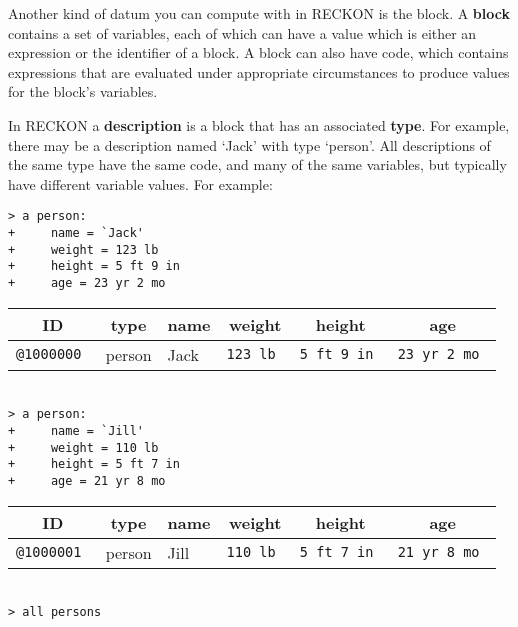 \documentclass[12pt]{article}
\newcommand{\key}[1]{{\rm \bfseries #1}}
\newenvironment{indpar}[1][0.3in]%
	{\begin{list}{}%
		     {\setlength{\itemsep}{0in}%
		      \setlength{\topsep}{0in}%
		      \setlength{\parsep}{1ex}%
		      \setlength{\labelwidth}{#1}%
		      \setlength{\leftmargin}{#1}%
		      \addtolength{\leftmargin}{\labelsep}}%
	 \item}%
	{\end{list}}
\begin{document}
Another kind of datum you can compute with in RECKON is
the block.  A \key{block} contains a set of variables, each of which
can have a value which is either an expression or the identifier of a
block.  A block can also
have code, which contains expressions that are evaluated under appropriate
circumstances to produce values for the block's variables.

In RECKON a \key{description}
is a block that has an associated \key{type}.  For
example, there may be a description named `Jack' with type `person'.
All descriptions
of the same type have the same code, and many of the same variables,
but typically have different variable values.  For example:

\begin{indpar}
\verb|> a person:| \\
\verb|+     name = `Jack'| \\
\verb|+     weight = 123 lb| \\
\verb|+     height = 5 ft 9 in| \\
\verb|+     age = 23 yr 2 mo| \\
\begin{tabular}{|r|l|l|r|r|r|}
\hline
\multicolumn{1}{|c}{\bf ID} &
\multicolumn{1}{|c}{\bf type} &
\multicolumn{1}{|c}{\bf name} &
\multicolumn{1}{|c}{\bf weight} &
\multicolumn{1}{|c}{\bf height} &
\multicolumn{1}{|c|}{\bf age} \\
\hline
\tt @1000000 & person & Jack & \tt 123 lb & \tt 5 ft 9 in & \tt 23 yr 2 mo \\
\hline
\end{tabular} \\[0.5ex]
\verb|> a person:| \\
\verb|+     name = `Jill'| \\
\verb|+     weight = 110 lb| \\
\verb|+     height = 5 ft 7 in| \\
\verb|+     age = 21 yr 8 mo| \\
\begin{tabular}{|r|l|l|r|r|r|}
\hline
\multicolumn{1}{|c}{\bf ID} &
\multicolumn{1}{|c}{\bf type} &
\multicolumn{1}{|c}{\bf name} &
\multicolumn{1}{|c}{\bf weight} &
\multicolumn{1}{|c}{\bf height} &
\multicolumn{1}{|c|}{\bf age} \\
\hline
\tt @1000001 & person & Jill & \tt 110 lb & \tt 5 ft 7 in & \tt 21 yr 8 mo \\
\hline
\end{tabular} \\[0.5ex]
\verb|> all persons| \\

\end{indpar}
\end{document}
